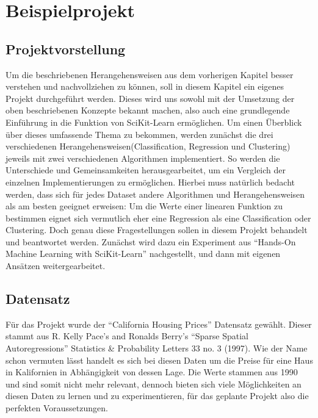 \chapter{Beispielprojekt}
\label{chap:Beispielprojekt}

\section{Projektvorstellung}
\label{sec:projektvorstellung}
Um die beschriebenen Herangehensweisen aus dem vorherigen Kapitel besser verstehen und nachvollziehen zu können, soll in diesem Kapitel ein eigenes Projekt durchgeführt werden. Dieses wird uns sowohl mit der Umsetzung der oben beschriebenen Konzepte bekannt machen, also auch eine grundlegende Einführung in die Funktion von SciKit-Learn ermöglichen. 
Um einen Überblick über dieses umfassende Thema zu bekommen, werden zunächst die drei verschiedenen Herangehensweisen(Classification, Regression und Clustering) jeweils mit zwei verschiedenen Algorithmen implementiert. So werden die Unterschiede und Gemeinsamkeiten herausgearbeitet, um ein Vergleich der einzelnen Implementierungen zu ermöglichen. Hierbei muss natürlich bedacht werden, dass sich für jedes Dataset andere Algorithmen und Herangehensweisen als am besten geeignet erweisen: Um die Werte einer linearen Funktion zu bestimmen eignet sich vermutlich eher eine Regression als eine Classification oder Clustering. Doch genau diese Fragestellungen sollen in diesem Projekt behandelt und beantwortet werden.
Zunächst wird dazu ein Experiment aus “Hands-On Machine Learning with SciKit-Learn” nachgestellt, und dann mit eigenen Ansätzen weitergearbeitet.

\section{Datensatz}
\label{sec:datensatz}
Für das Projekt wurde der “California Housing Prices” Datensatz gewählt. Dieser stammt aus R. Kelly Pace’s and Ronalds Berry’s “Sparse Spatial Autoregressions” Statistics \& Probability Letters 33 no. 3 (1997). Wie der Name schon vermuten lässt handelt es sich bei diesen Daten um die Preise für eine Haus in Kalifornien in Abhängigkeit von dessen Lage. Die Werte stammen aus 1990  und sind somit nicht mehr relevant, dennoch bieten sich viele Möglichkeiten an diesen Daten zu lernen und zu experimentieren, für das geplante Projekt also die perfekten Voraussetzungen.

